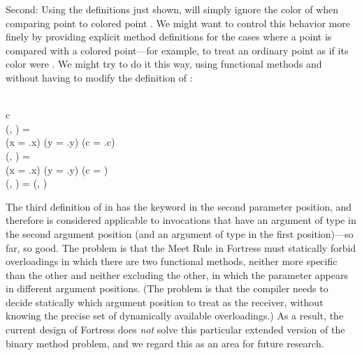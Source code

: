 Second: Using the definitions just shown,
 will simply ignore the color of  when
comparing point  to colored point .
We might want to control this behavior more finely by providing
explicit method definitions for
the cases where a point is compared with a colored point---for example,
to treat an ordinary point as if its color were .
We might try to do it this way, using functional methods and
without having to modify the definition of :
\begin{codeexamplesize}
\begin{FortressCode}
   \fortresscommentsep   {} \\
\2\+c\COLON {} \\
  (, \COLON {})\COLON {} = \\
  \2\+(x = .x) \wedge (y = .y) \wedge (c = .c)\- \\
  (, \COLON {})\COLON {} = \\
  \2\+(x = .x) \wedge (y = .y) \wedge (c = )\- \\
  (\COLON {}, )\COLON {} = (, )\- \\
\end{FortressCode}
\end{codeexamplesize}
The third definition of  in 
has the  keyword in the second parameter position,
and therefore is considered applicable to invocations that have
an argument of type  in the second argument position
(and an argument of type  in the first position)---so far, so good.
The problem is that the Meet Rule in Fortress must statically forbid overloadings
in which there are two functional methods, neither more specific than the other
and neither excluding the other, in which the  parameter appears in different
argument positions.  (The problem is that the compiler needs to decide statically
which argument position to treat as the receiver, without knowing the precise set
of dynamically available overloadings.)  As a result, the current design of
Fortress does \emph{not} solve this particular extended version of the binary method
problem, and we regard this as an area for future research.


